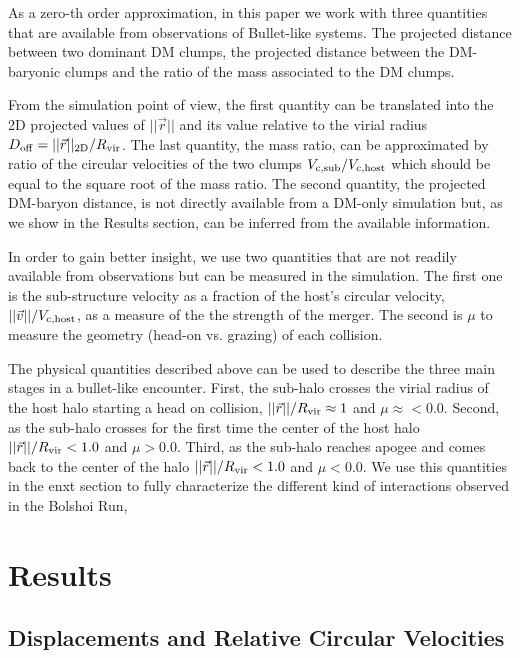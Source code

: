 \documentclass{emulateapj}
\begin{document}
As a zero-th order approximation, in this paper we work with three
quantities that are available from observations of Bullet-like
systems. The projected distance between two dominant DM clumps, the
projected distance between the DM-baryonic clumps and the ratio of the
mass associated to the DM clumps.  

From the simulation point of view, the first quantity can be
translated into the 2D projected values of $||\vec{r}||$ and its value
relative to the virial radius $D_{\rm   off}= ||\vec{r}||_{\rm
  2D}/R_{\rm vir}$. The last quantity, the mass ratio, can be
approximated by ratio of the circular velocities of the two clumps $V_{\rm c,sub}/V_{\rm  c,host}$ which should be equal to the square root of the mass
ratio. The second quantity, the projected DM-baryon distance, is not
directly available from a DM-only simulation but, as we show in the
Results section, can be inferred from the available information.  
 


In order to gain better insight, we use two
quantities that are not readily available from observations but can be
measured in the simulation. The first one is the sub-structure
velocity as a fraction of the host's circular velocity, $||\vec{v}||/V_{\rm c, host}$, as a measure of the the strength of the
merger.  The second is $\mu$ to measure the geometry (head-on
vs. grazing) of each collision.


The physical quantities described above can be used to describe
the three main stages in a bullet-like encounter. First, the sub-halo
crosses the virial radius of the host halo starting a head on
collision, $||\vec{r}||/R_{\rm vir}\approx 1$ and
$\mu\approx<0.0$. Second, as the sub-halo crosses for the first time
the center of the host halo $||\vec{r}||/R_{\rm vir} < 1.0$ and
$\mu>0.0$. Third, as the sub-halo reaches apogee and comes back to the
center of the halo $||\vec{r}||/R_{\rm vir} < 1.0$ and $\mu<0.0$. We use
this quantities in the enxt section to fully characterize the different
kind of interactions observed in the Bolshoi Run,


\section{Results}
\label{sec:results}

\subsection{Displacements and Relative Circular Velocities}
\label{fig:displacement}
\end{document}
